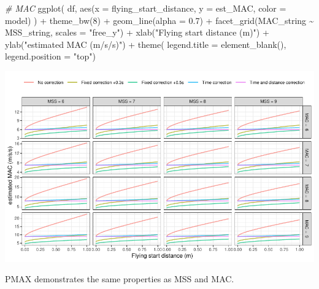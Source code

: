 \documentclass[fleqn,10pt,lineno]{wlpeerj} %
\newenvironment{Shaded}{\begin{snugshade}}{\end{snugshade}}
\newcommand{\AttributeTok}[1]{\textcolor[rgb]{0.77,0.63,0.00}{#1}}
\newcommand{\CommentTok}[1]{\textcolor[rgb]{0.56,0.35,0.01}{\textit{#1}}}
\newcommand{\DecValTok}[1]{\textcolor[rgb]{0.00,0.00,0.81}{#1}}
\newcommand{\FloatTok}[1]{\textcolor[rgb]{0.00,0.00,0.81}{#1}}
\newcommand{\FunctionTok}[1]{\textcolor[rgb]{0.00,0.00,0.00}{#1}}
\newcommand{\NormalTok}[1]{#1}
\newcommand{\SpecialCharTok}[1]{\textcolor[rgb]{0.00,0.00,0.00}{#1}}
\newcommand{\StringTok}[1]{\textcolor[rgb]{0.31,0.60,0.02}{#1}}
\begin{document}
\begin{Shaded}
\begin{Highlighting}[]
\CommentTok{\# MAC}
\FunctionTok{ggplot}\NormalTok{(}
\NormalTok{  df,}
  \FunctionTok{aes}\NormalTok{(}\AttributeTok{x =}\NormalTok{ flying\_start\_distance, }\AttributeTok{y =}\NormalTok{ est\_MAC, }\AttributeTok{color =}\NormalTok{ model)}
\NormalTok{) }\SpecialCharTok{+}
  \FunctionTok{theme\_bw}\NormalTok{(}\DecValTok{8}\NormalTok{) }\SpecialCharTok{+}
  \FunctionTok{geom\_line}\NormalTok{(}\AttributeTok{alpha =} \FloatTok{0.7}\NormalTok{) }\SpecialCharTok{+}
  \FunctionTok{facet\_grid}\NormalTok{(MAC\_string }\SpecialCharTok{\textasciitilde{}}\NormalTok{ MSS\_string, }\AttributeTok{scales =} \StringTok{"free\_y"}\NormalTok{) }\SpecialCharTok{+}
  \FunctionTok{xlab}\NormalTok{(}\StringTok{"Flying start distance (m)"}\NormalTok{) }\SpecialCharTok{+}
  \FunctionTok{ylab}\NormalTok{(}\StringTok{"estimated MAC (m/s/s)"}\NormalTok{) }\SpecialCharTok{+}
  \FunctionTok{theme}\NormalTok{(}
    \AttributeTok{legend.title =} \FunctionTok{element\_blank}\NormalTok{(),}
    \AttributeTok{legend.position =} \StringTok{"top"}\NormalTok{)}
\end{Highlighting}
\end{Shaded}

\begin{center}\includegraphics[width=1\linewidth]{paper_files/figure-latex/unnamed-chunk-43-1} \end{center}

PMAX demonstrates the same properties as MSS and MAC.
\end{document}

